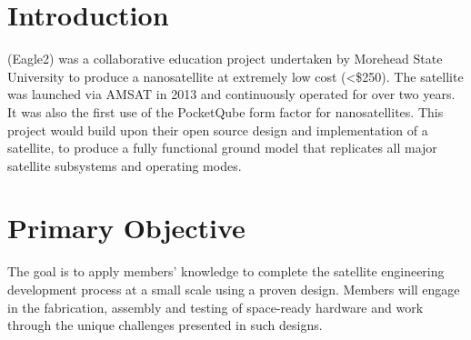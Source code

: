 \documentclass[conference]{IEEEtran} %
\begin{document}

\section{Introduction}
\label{sec:introduction}

 (Eagle2) was a collaborative education project undertaken by Morehead State University to produce a nanosatellite at extremely low cost (<\$250).
The satellite was launched via AMSAT in 2013 and continuously operated for over two years.
It was also the first use of the PocketQube form factor for nanosatellites.\cite{PocketQube}
This project would build upon their open source design and implementation of a satellite, to produce a fully functional ground model that replicates all major satellite subsystems and operating modes.


\section{Primary Objective}
\label{sec:primary-obj}

The goal is to apply members' knowledge to complete the satellite engineering development process at a small scale using a proven design.
Members will engage in the fabrication, assembly and testing of space-ready hardware and work through the unique challenges presented in such designs.

\end{document}
